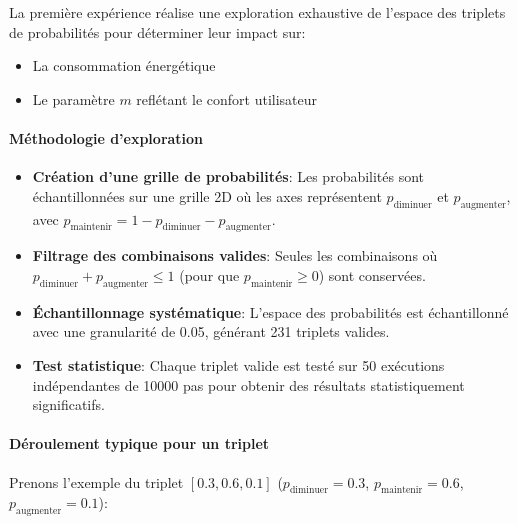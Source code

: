 La première expérience réalise une exploration exhaustive de l'espace des triplets de probabilités pour déterminer leur impact sur:
\begin{itemize}
    \item La consommation énergétique
    \item Le paramètre $m$ reflétant le confort utilisateur
\end{itemize}

\paragraph{Méthodologie d'exploration}
\begin{itemize}
    \item \textbf{Création d'une grille de probabilités}: 
    Les probabilités sont échantillonnées sur une grille 2D où les axes représentent $p_{\text{diminuer}}$ et $p_{\text{augmenter}}$, avec $p_{\text{maintenir}} = 1 - p_{\text{diminuer}} - p_{\text{augmenter}}$.
    
    \item \textbf{Filtrage des combinaisons valides}: 
    Seules les combinaisons où $p_{\text{diminuer}} + p_{\text{augmenter}} \leq 1$ (pour que $p_{\text{maintenir}} \geq 0$) sont conservées.
    
    \item \textbf{Échantillonnage systématique}: 
    L'espace des probabilités est échantillonné avec une granularité de 0.05, générant 231 triplets valides.
    
    \item \textbf{Test statistique}: 
    Chaque triplet valide est testé sur 50 exécutions indépendantes de 10000 pas pour obtenir des résultats statistiquement significatifs.
\end{itemize}

\paragraph{Déroulement typique pour un triplet}
Prenons l'exemple du triplet $[0.3, 0.6, 0.1]$ ($p_{\text{diminuer}}=0.3$, $p_{\text{maintenir}}=0.6$, $p_{\text{augmenter}}=0.1$):

